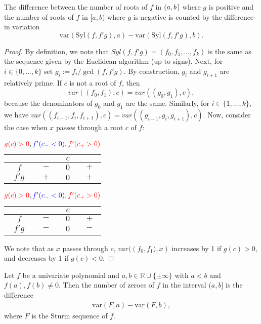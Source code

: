 \documentclass[12pt]{amsart}
\theoremstyle{definition}
\begin{document}
\theorem[Sylvester]
The difference between the number of roots of $f$ in $(a,b\hspace{.05cm}]$ where $g$ is positive and the number of roots of $f$ in $[a,b)$ where $g$ is negative is counted by the difference in variation $$\text{var}(\text{Syl}(f,f'g),a) - \text{var}(\text{Syl}(f,f'g),b).$$

\begin{proof} By definition, we note that $Syl(f,f'g) = (f_{0},f_{1},\dots, f_{k})$ is the same as the sequence given by the Euclidean algorithm (up to signs). Next, for $i\in\{0,\dots,k\}$ set $g_{i} := f_{i}/\gcd(f,f'g)$. By construction, $g_{i}$ and $g_{i+1}$ are relatively prime. If $c$ is not a root of $f$, then $$var\left((f_{0},f_{1}),c\right) = var\left((g_{0},g_{1}),c\right),$$ because the denominators of $g_{0}$ and $g_{1}$ are the same. Similarly, for $i\in\{1,\dots,k\}$, we have $var\left((f_{i-1},f_{i},f_{i+1}),c\right) = var\left((g_{i-1},g_{i},g_{i+1}),c\right)$. Now, consider the case when $x$ passes through a root $c$ of $f$:

\begin{table}[h]
\begin{tabular}{c|ccc}
  &   & $c$ &   \\
  \hline
$f$ & $-$ & $0$ & $+$ \\
$f'g$ & $+$ & $0$ & $+$ \\
\end{tabular}
\vspace{0.3cm}
\caption*{$\textcolor{red}{g(c)>0},\textcolor{red}{f'(c_{-}>0)},\textcolor{red}{f'(c_{+}>0)}$}

\begin{tabular}{c|ccc}
  &   & $c$ &   \\
  \hline
$f$ & $-$ & $0$ & $+$ \\
$f'g$ & $-$ & $0$ & $-$ \\
\end{tabular}
\vspace{0.3cm}
\caption*{$\textcolor{red}{g(c)>0},\textcolor{blue}{f'(c_{-}<0)},\textcolor{red}{f'(c_{+}>0)}$}
\end{table}

We note that as $x$ passes through $c$, $var(\left(f_{0},f_{1}),x\right)$ increases by 1 if $g(c)>0$, and decreases by 1 if $g(c)<0$.


\end{proof}

\theorem[Sturm]
Let $f$ be a univariate polynomial and $a,b\in \mathbb{R}\cup\{\pm\infty\}$ with $a<b$ and $f(a),f(b)\neq 0$. Then the number of zeroes of $f$ in the interval $(a,b]$ is the difference 
\begin{align*}
\text{var}(F,a) - \text{var}(F,b),
\end{align*}
where $F$ is the Sturm sequence of $f$.
\end{document}
